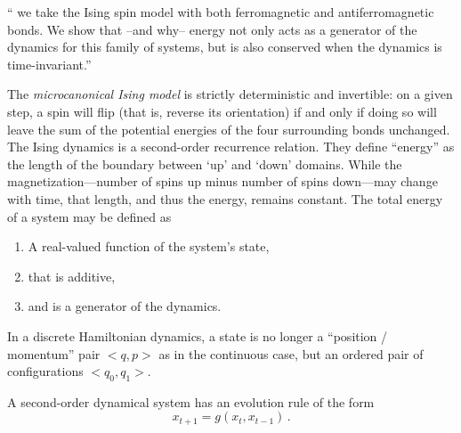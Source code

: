 \begin{description}
{``
we take the Ising spin model with both
ferromagnetic and antiferromagnetic bonds. We show that --and why--
energy not only acts as a generator of the dynamics for this family of
systems, but is also conserved when the dynamics is time-invariant.''

The \emph{microcanonical Ising model} is strictly deterministic and
invertible: on a given step, a spin will flip (that is, reverse its
orientation) if and only if doing so will leave the sum of the potential
energies of the four surrounding bonds unchanged. The Ising dynamics is a
second-order recurrence relation. They define ``energy'' as the length of the
boundary between `up' and `down' domains. While the magnetization—number of
spins up minus number of spins down—may change with time, that length, and
thus the energy, remains constant. The total energy of a system may be
defined as
\begin{enumerate}
  \item A real-valued function of the system's state,
  \item that is additive,
  \item and is a generator of the dynamics.
\end{enumerate}
In a discrete Hamiltonian dynamics, a state is no longer a
``position / momentum'' pair $<q,p>$ as in the continuous case, but an ordered
pair of configurations $<q_0,q_1>$.

A second-order dynamical system
has an evolution rule of the form
\[
x_{t+1} = g(x_{t},x_{t-1})
\,.
\]
            }

\end{description}
